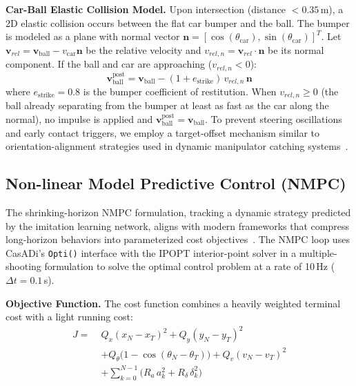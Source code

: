 \documentclass[10pt,twocolumn,letterpaper]{article}
\begin{document}
\textbf{Car-Ball Elastic Collision Model.} Upon intersection
(distance $< 0.35$\,m), a 2D elastic collision occurs between the flat
car bumper and the ball. The bumper is modeled as a plane with normal
vector
$\mathbf{n} = [\cos(\theta_{\text{car}}),
\sin(\theta_{\text{car}})]^T$. Let
$\mathbf{v}_{rel} = \mathbf{v}_{\text{ball}} -
v_{\text{car}}\mathbf{n}$
be the relative velocity and
$v_{rel,n} = \mathbf{v}_{rel} \cdot \mathbf{n}$ be its normal
component. If the ball and car are approaching ($v_{rel,n} < 0$):
\begin{equation}
  \mathbf{v}_{\text{ball}}^{\text{post}} =
    \mathbf{v}_{\text{ball}} -
    (1 + e_{\text{strike}})\, v_{rel,n}\, \mathbf{n}
  \label{eq:collision}
\end{equation}
where $e_{\text{strike}} = 0.8$ is the bumper coefficient of
restitution. When $v_{rel,n} \ge 0$ (the ball already separating from
the bumper at least as fast as the car along the normal), no impulse is
applied and $\mathbf{v}_{\text{ball}}^{\text{post}} =
\mathbf{v}_{\text{ball}}$. To prevent steering oscillations and early
contact triggers, we employ
a target-offset mechanism similar to orientation-alignment strategies
used in dynamic manipulator catching
systems~\cite{adrl2021dynamic}.

\subsection{Non-linear Model Predictive Control (NMPC)}

The shrinking-horizon NMPC formulation, tracking a dynamic strategy
predicted by the imitation learning network, aligns with modern
frameworks that compress long-horizon behaviors into parameterized cost
objectives~\cite{amos2022zipmpc}. The NMPC loop uses CasADi's
\texttt{Opti()} interface with the IPOPT interior-point solver in a
multiple-shooting formulation to solve the optimal control problem at a
rate of 10\,Hz ($\Delta t = 0.1$\,s).

\textbf{Objective Function.} The cost function combines a heavily
weighted terminal cost with a light running cost:
\begin{align}
  J =\; & Q_x (x_N - x_T)^2 + Q_y (y_N - y_T)^2 \nonumber\\
        & + Q_\theta \bigl(1 - \cos(\theta_N - \theta_T)\bigr)
          + Q_v (v_N - v_T)^2 \nonumber\\
        & + \sum_{k=0}^{N-1}
          \bigl( R_a\, a_k^2 + R_\delta\, \delta_k^2 \bigr)
  \label{eq:cost}
\end{align}
\end{document}

